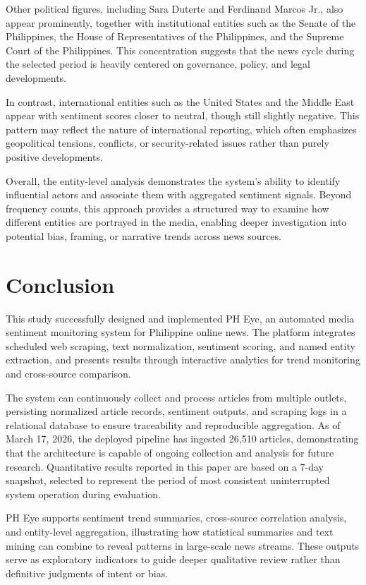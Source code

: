 \documentclass[sigconf, nonacm]{acmart}
\begin{document}
Other political figures, including Sara Duterte and Ferdinand Marcos Jr., also appear prominently, together with institutional entities such as the Senate of the Philippines, the House of Representatives of the Philippines, and the Supreme Court of the Philippines. This concentration suggests that the news cycle during the selected period is heavily centered on governance, policy, and legal developments.

In contrast, international entities such as the United States and the Middle East appear with sentiment scores closer to neutral, though still slightly negative. This pattern may reflect the nature of international reporting, which often emphasizes geopolitical tensions, conflicts, or security-related issues rather than purely positive developments.

Overall, the entity-level analysis demonstrates the system’s ability to identify influential actors and associate them with aggregated sentiment signals. Beyond frequency counts, this approach provides a structured way to examine how different entities are portrayed in the media, enabling deeper investigation into potential bias, framing, or narrative trends across news sources.

\section{Conclusion}
This study successfully designed and implemented PH Eye, an automated media sentiment monitoring system for Philippine online news. The platform integrates scheduled web scraping, text normalization, sentiment scoring, and named entity extraction, and presents results through interactive analytics for trend monitoring and cross-source comparison.

The system can continuously collect and process articles from multiple outlets, persisting normalized article records, sentiment outputs, and scraping logs in a relational database to ensure traceability and reproducible aggregation. As of March 17, 2026, the deployed pipeline has ingested 26,510 articles, demonstrating that the architecture is capable of ongoing collection and analysis for future research. Quantitative results reported in this paper are based on a 7-day snapshot, selected to represent the period of most consistent uninterrupted system operation during evaluation.

PH Eye supports sentiment trend summaries, cross-source correlation analysis, and entity-level aggregation, illustrating how statistical summaries and text mining can combine to reveal patterns in large-scale news streams. These outputs serve as exploratory indicators to guide deeper qualitative review rather than definitive judgments of intent or bias.
\end{document}
